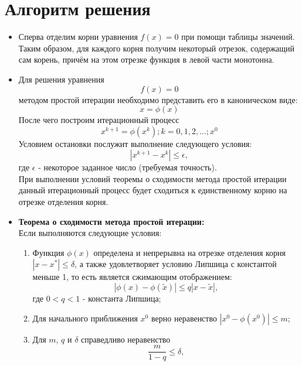 \documentclass[14pt, a4paper]{article}
\begin{document}
  \section{Алгоритм решения}
  \begin{itemize}
    \item
    Сперва отделим корни уравнения $f(x) = 0$ при помощи таблицы значений. Таким образом, для каждого корня получим некоторый отрезок, содержащий сам корень, причём на этом отрезке функция в левой части монотонна.
    \item
    Для решения уравнения \begin{equation}f(x) = 0\end{equation} методом простой итерации необходимо представить его в каноническом виде: \begin{equation}x = \phi(x)\end{equation}
    После чего построим итерационный процесс \begin{equation}x^{k + 1} = \phi(x^k); k = 0, 1, 2, ...; x^0\end{equation}
    Условием остановки послужит выполнение следующего условия: \begin{equation}|x^{k + 1} - x^k| \leq \epsilon,\end{equation} где $\epsilon$ - некоторое заданное число (требуемая точность).\\
    При выполнении условий теоремы о сходимости метода простой итерации данный итерационный процесс будет сходиться к единственному корню на отрезке отделения корня.
    \item
    \textbf{Теорема о сходимости метода простой итерации:}\\
    Если выполняются следующие условия:
      \begin{enumerate}
        \item
          Функция $\phi(x)$ определена и непрерывна на отрезке отделения корня $|x - x^*| \leq \delta$, а также удовлетворяет условию Липшица с константой меньше 1,
          то есть является сжимающим отображением: \begin{equation}|\phi(x) - \phi(\tilde{x})| \leq q|x - \tilde{x}|,\end{equation}
          где $0 < q < 1$ - константа Липшица;
        \item
          Для начального приближения $x^0$ верно неравенство $|x^0 - \phi(x^0)| \leq m$;
        \item
          Для $m$, $q$ и $\delta$ справедливо неравенство \begin{equation}\frac{m}{1 - q} \leq \delta,\end{equation}

\end{enumerate}
\end{itemize}
\end{document}
